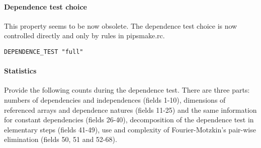 
\paragraph{Dependence test choice}

This property seems to be now obsolete. The dependence test choice is
now controlled directly and only by rules in pipsmake.rc.

\begin{verbatim}
DEPENDENCE_TEST "full"
\end{verbatim}

\paragraph{Statistics}

Provide the following counts during the dependence test. There are three
parts: numbers of dependencies and independences (fields 1-10),
dimensions of referenced arrays and dependence natures (fields 11-25)
and the same information for constant dependencies (fields 26-40),
decomposition of the dependence test in elementary steps (fields 41-49),
use and complexity of Fourier-Motzkin's pair-wise elimination (fields
50, 51 and 52-68).

